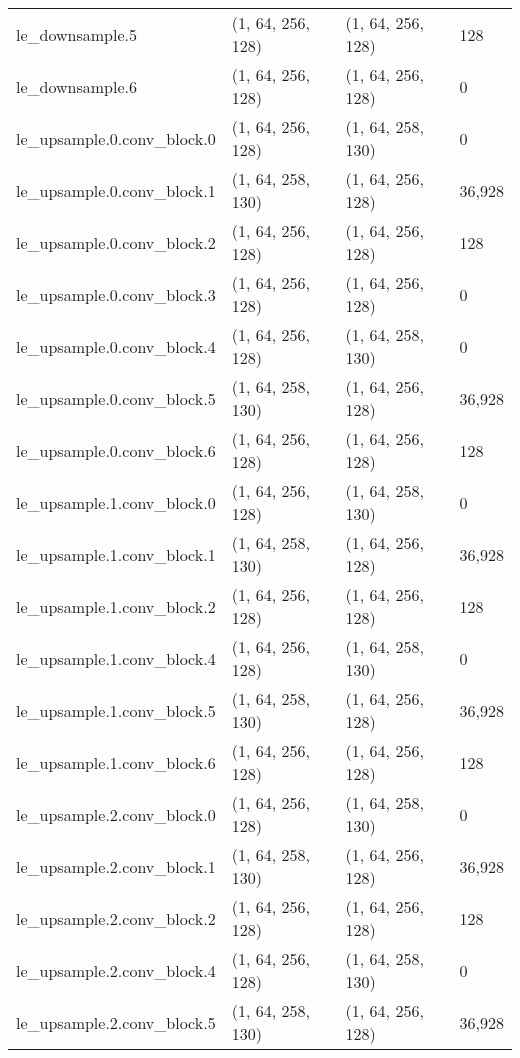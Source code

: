 \begin{longtable}{llll}
                    le\_downsample.5 &  (1, 64, 256, 128) &  (1, 64, 256, 128) &         128 \\
                    le\_downsample.6 &  (1, 64, 256, 128) &  (1, 64, 256, 128) &           0 \\
        le\_upsample.0.conv\_block.0 &  (1, 64, 256, 128) &  (1, 64, 258, 130) &           0 \\
        le\_upsample.0.conv\_block.1 &  (1, 64, 258, 130) &  (1, 64, 256, 128) &      36,928 \\
        le\_upsample.0.conv\_block.2 &  (1, 64, 256, 128) &  (1, 64, 256, 128) &         128 \\
        le\_upsample.0.conv\_block.3 &  (1, 64, 256, 128) &  (1, 64, 256, 128) &           0 \\
        le\_upsample.0.conv\_block.4 &  (1, 64, 256, 128) &  (1, 64, 258, 130) &           0 \\
        le\_upsample.0.conv\_block.5 &  (1, 64, 258, 130) &  (1, 64, 256, 128) &      36,928 \\
        le\_upsample.0.conv\_block.6 &  (1, 64, 256, 128) &  (1, 64, 256, 128) &         128 \\
        le\_upsample.1.conv\_block.0 &  (1, 64, 256, 128) &  (1, 64, 258, 130) &           0 \\
        le\_upsample.1.conv\_block.1 &  (1, 64, 258, 130) &  (1, 64, 256, 128) &      36,928 \\
        le\_upsample.1.conv\_block.2 &  (1, 64, 256, 128) &  (1, 64, 256, 128) &         128 \\
        le\_upsample.1.conv\_block.4 &  (1, 64, 256, 128) &  (1, 64, 258, 130) &           0 \\
        le\_upsample.1.conv\_block.5 &  (1, 64, 258, 130) &  (1, 64, 256, 128) &      36,928 \\
        le\_upsample.1.conv\_block.6 &  (1, 64, 256, 128) &  (1, 64, 256, 128) &         128 \\
        le\_upsample.2.conv\_block.0 &  (1, 64, 256, 128) &  (1, 64, 258, 130) &           0 \\
        le\_upsample.2.conv\_block.1 &  (1, 64, 258, 130) &  (1, 64, 256, 128) &      36,928 \\
        le\_upsample.2.conv\_block.2 &  (1, 64, 256, 128) &  (1, 64, 256, 128) &         128 \\
        le\_upsample.2.conv\_block.4 &  (1, 64, 256, 128) &  (1, 64, 258, 130) &           0 \\
        le\_upsample.2.conv\_block.5 &  (1, 64, 258, 130) &  (1, 64, 256, 128) &      36,928 \\

\end{longtable}
